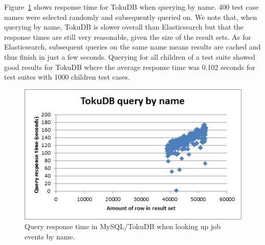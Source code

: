 Figure~\ref{fig:toku_by_name} shows response time for TokuDB when querying by name. 400 test case names were selected randomly and subsequently queried on. We note that, when querying by name, TokuDB is slower overall than Elasticsearch but that the response times are still very reasonable, given the size of the result sets. As for Elasticsearch, subsequent queries on the same name means results are cached and thus finish in just a few seconds. 
Querying for all children of a test suite showed good results for TokuDB where the average response time was 0.102 seconds for test suites with 1000 children test cases.

\begin{figure}[h!]
\centering
\includegraphics[]{figure/toku_by_name.png}
\caption{Query response time in MySQL/TokuDB when looking up job events by name.}
\label{fig:toku_by_name}
\end{figure}
%

